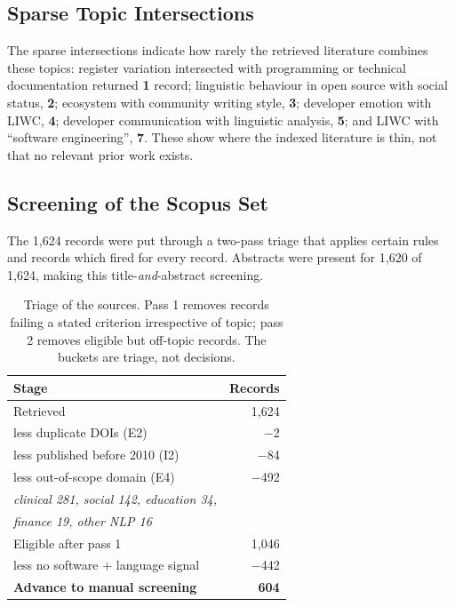 \documentclass[conference]{IEEEtran}
\begin{document}
\subsection{Sparse Topic Intersections}

The sparse intersections indicate how rarely the retrieved literature combines these topics: register variation intersected with programming or technical documentation returned \textbf{1} record; linguistic behaviour in open source with social status, \textbf{2}; ecosystem with community writing style, \textbf{3}; developer emotion with LIWC, \textbf{4}; developer communication with linguistic analysis, \textbf{5}; and LIWC with ``software engineering'', \textbf{7}. These show where the indexed literature is thin, not that no relevant prior work exists.

\subsection{ Screening of the Scopus Set}

The 1{,}624 records were put through a two-pass triage that applies certain rules
and records which fired for every record. Abstracts were present for 1{,}620 of 1{,}624, making this
title-\emph{and}-abstract screening.

\begin{table}[htbp]
\caption{Triage of the sources. Pass 1 removes records
failing a stated criterion irrespective of topic; pass 2 removes eligible but
off-topic records. The buckets are triage, not decisions.}
\label{tbl:triage}
\begin{center}
\begin{tabular}{lr}
\toprule
\textbf{Stage} & \textbf{Records} \\
\midrule
Retrieved & 1{,}624 \\
\quad less duplicate DOIs (E2) & $-$2 \\
\quad less published before 2010 (I2) & $-$84 \\
\quad less out-of-scope domain (E4) & $-$492 \\
\quad\quad \emph{clinical 281, social 142, education 34,} & \\
\quad\quad \emph{finance 19, other NLP 16} & \\
\midrule
Eligible after pass 1 & 1{,}046 \\
\quad less no software $+$ language signal & $-$442 \\
\midrule
\textbf{Advance to manual screening} & \textbf{604} \\
\bottomrule
\end{tabular}
\end{center}
\end{table}
\end{document}
